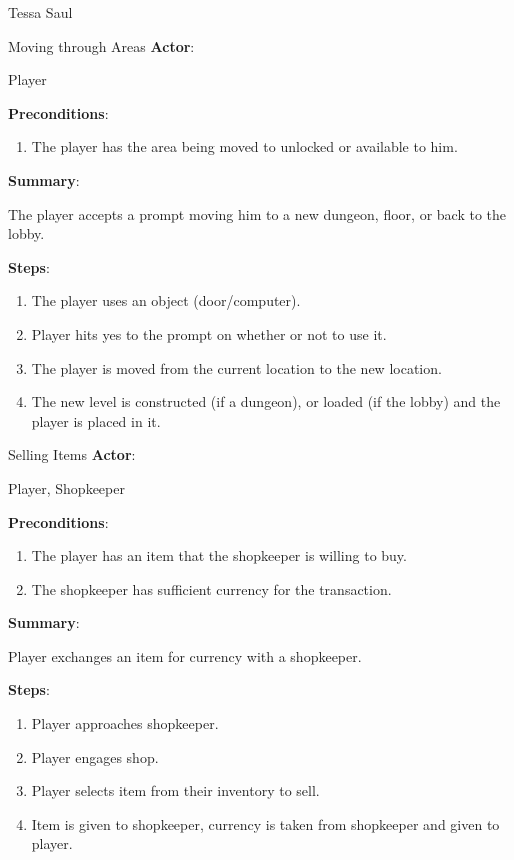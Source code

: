 \documentclass[12pt]{report}
\begin{document}
\begin{section}{Tessa Saul}
\begin{subsection}{Moving through Areas}
\textbf{Actor}:

Player

\textbf{Preconditions}:

\begin{enumerate}
\item The player has the area being moved to unlocked or available to him.
\end{enumerate}

\textbf{Summary}:

The player accepts a prompt moving him to a new dungeon, floor, or
back to the lobby.

\textbf{Steps}:

\begin{enumerate}
\item The player uses an object (door/computer).
\item Player hits yes to the prompt on whether or not to use it.
\item The player is moved from the current location to the new location.
\item The new level is constructed (if a dungeon), or loaded (if the lobby)
and the player is placed in it.
\end{enumerate}
\end{subsection}

\begin{subsection}{Selling Items}
\textbf{Actor}:

Player, Shopkeeper

\textbf{Preconditions}:

\begin{enumerate}
\item The player has an item that the shopkeeper is willing to buy.
\item The shopkeeper has sufficient currency for the transaction.
\end{enumerate}

\textbf{Summary}:

Player exchanges an item for currency with a shopkeeper.

\textbf{Steps}:
 
\begin{enumerate}
\item Player approaches shopkeeper.
\item Player engages shop.
\item Player selects item from their inventory to sell.
\item Item is given to shopkeeper, currency is taken from shopkeeper and
given to player.
\end{enumerate}
\end{subsection}


\end{section}
\end{document}
